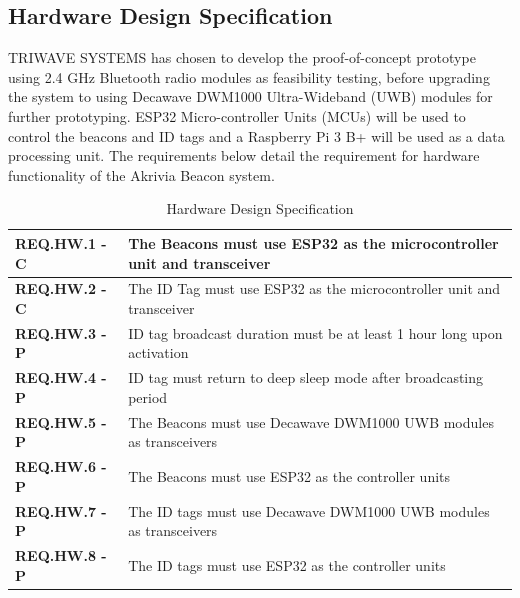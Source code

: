 \pagebreak
\subsection{Hardware Design Specification}
\medskip
TRIWAVE SYSTEMS has chosen to develop the proof-of-concept prototype using 2.4 GHz Bluetooth radio modules as feasibility testing, before upgrading the system to using Decawave DWM1000 Ultra-Wideband (UWB) modules for further prototyping. ESP32 Micro-controller Units (MCUs) will be used to control the beacons and ID tags and a Raspberry Pi 3 B+ will be used as a data processing unit. The requirements below detail the requirement for hardware functionality of the Akrivia Beacon system.

\medskip
\bgroup
\def\arraystretch{1.5}
\begin{table}[H]
\centering
\begin{tabular}{ | m{3cm} | m{12.5cm} |}
\hline
\textbf{REQ.HW.1 - C} & The Beacons must use ESP32 as the microcontroller unit and transceiver \\
\hline
\textbf{REQ.HW.2 - C} & The ID Tag must use ESP32 as the microcontroller unit and transceiver \\
\hline
\textbf{REQ.HW.3 - P} & ID tag broadcast duration must be at least 1 hour long upon activation\\
\hline
\textbf{REQ.HW.4 - P} & ID tag must return to deep sleep mode after broadcasting period\\
\hline
\textbf{REQ.HW.5 - P} & The Beacons must use Decawave DWM1000 UWB modules as transceivers\\
\hline
\textbf{REQ.HW.6 - P} & The Beacons must use ESP32 as the controller units\\
\hline
\textbf{REQ.HW.7 - P} & The ID tags must use Decawave DWM1000 UWB modules as transceivers\\
\hline
\textbf{REQ.HW.8 - P} & The ID tags must use ESP32 as the controller units\\
\hline
\end{tabular}
\caption{Hardware Design Specification}
\end{table}


